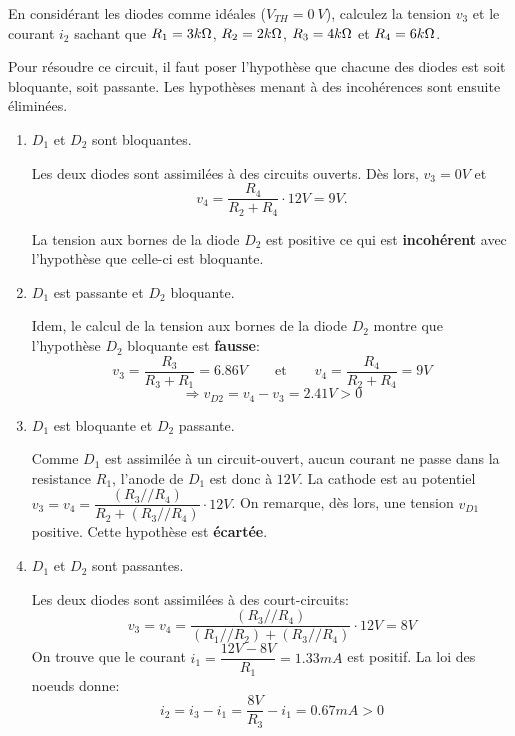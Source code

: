 \documentclass{../template/tp}
\begin{document}
\Question
{
    En considérant les diodes comme idéales ($ V_{TH} = 0~V $), calculez la tension $ v_{3} $ et le courant $ i_{2} $ sachant que $ R_{1} = 3k\ohm $, $ R_{2} = 2k\ohm $, $ R_{3} = 4k\ohm $ et $ R_{4} = 6k\ohm $.
}
{
    Pour résoudre ce circuit, il faut poser l'hypothèse que chacune des diodes est soit bloquante, soit passante. Les hypothèses menant à des incohérences sont ensuite  éliminées. 

  \begin{enumerate}
      \item $ D_{1} $ et $ D_{2} $ sont bloquantes.

      Les deux diodes sont assimilées à des circuits ouverts.
      Dès lors, $ v_{3} = 0V $ et \[ v_{4} = \dfrac{ R_{4} }{ R_{2} + R_{4}} \cdot 12V = 9V. \]

      La tension aux bornes de la diode $ D_{2} $ est positive ce qui est \textbf{incohérent} avec l'hypothèse que celle-ci est bloquante.

      \item $ D_{1} $ est passante et $ D_{2} $ bloquante.

      Idem, le calcul de la tension aux bornes de la diode $ D_{2} $ montre que l'hypothèse $ D_{2} $ bloquante est \textbf{fausse}:
      $$ v_{3} = \frac{ R_{3} }{ R_{3} + R_{1} } = 6.86V \qquad\text{et}\qquad  v_{4} = \frac{ R_{4} }{ R_{2} + R_{4} } = 9V $$
      $$ \Rightarrow v_{D2} = v_{4} - v_{3} = 2.41V > 0 $$

      \item $ D_{1} $ est bloquante et $ D_{2} $ passante.

      Comme $ D_{1} $ est assimilée à un circuit-ouvert, aucun courant ne passe dans la resistance $ R_{1} $, l'anode de $ D_{1} $ est donc à $ 12V $.
      La cathode est au potentiel $ v_{3} = v_{4} = \dfrac{ ( R_{3} // R_{4} ) }{ R_{2} + ( R_{3} // R_{4} ) } \cdot 12V $. 
      On remarque, dès lors, une tension $v_{D1}$ positive. 
      Cette hypothèse est \textbf{écartée}.

      \item $ D_{1} $ et $ D_{2} $ sont passantes.

       Les deux diodes sont assimilées à des court-circuits:
      $$ v_{3} = v_{4} = \dfrac{ ( R_{3} // R_{4} ) }{ ( R_{1} // R_{2} ) + ( R_{3} // R_{4} ) } \cdot 12V = \boxed{8V} $$
      On trouve que le courant $ i_{1} = \dfrac{ 12V - 8V }{ R_{1} } = 1.33mA $ est positif. La loi des noeuds donne:
      $$ i_{2} = i_{3} - i_{1} = \frac{ 8V }{ R_{3} } -i_{1} = \boxed{0.67mA} > 0 $$

  \end{enumerate}

}
\end{document}
